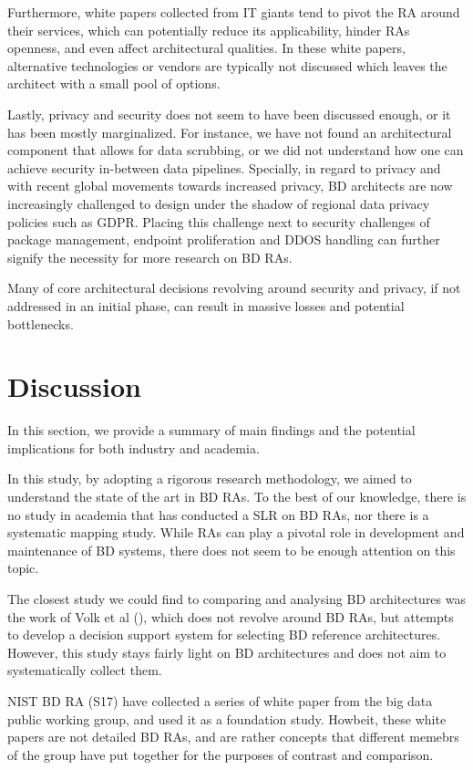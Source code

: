 \documentclass{ieeeaccess}
\begin{document}
Furthermore, white papers collected from IT giants tend to pivot the RA around their services, which can potentially reduce its applicability, hinder RAs openness, and even affect architectural qualities. In these white papers, alternative technologies or vendors are typically not discussed which leaves the architect with a small pool of options.

Lastly, privacy and security does not seem to have been discussed enough, or it has been mostly marginalized. For instance, we have not found an architectural component that allows for data scrubbing, or we did not understand how one can achieve security in-between data pipelines. Specially, in regard to privacy and with recent global movements towards increased privacy, BD architects are now increasingly challenged to design under the shadow of regional data privacy policies such as GDPR. Placing this challenge next to security challenges of package management, endpoint proliferation and DDOS handling can further signify the necessity for more research on BD RAs.

Many of core architectural decisions revolving around security and privacy, if not addressed in an initial phase, can result in massive losses and potential bottlenecks. 

\section{Discussion}

In this section, we provide a summary of main findings and the potential implications for both industry and academia. 

In this study, by adopting a rigorous research methodology, we aimed to understand the state of the art in BD RAs. To the best of our knowledge, there is no study in academia that has conducted a SLR on BD RAs, nor there is a systematic mapping study. While RAs can play a pivotal role in development and maintenance of BD systems, there does not seem to be enough attention on this topic. 

The closest study we could find to comparing and analysing BD architectures was the work of Volk et al (\cite{volk2019decision}), which does not revolve around BD RAs, but attempts to develop a decision support system for selecting BD reference architectures. However, this study stays fairly light on BD architectures and does not aim to systematically collect them. 

NIST BD RA (S17) have collected a series of white paper from the big data public working group, and used it as a foundation study. Howbeit, these white papers are not detailed BD RAs, and are rather concepts that different memebrs of the group have put together for the purposes of contrast and comparison. 
\end{document}
